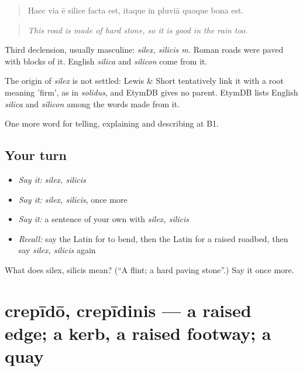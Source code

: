 \begin{quote}
Haec via ē silice facta est, itaque in pluviā quoque bona est.
\end{quote}

\begin{quote}
\emph{This road is made of hard stone, so it is good in the rain too.}
\end{quote}

Third declension, usually masculine: \emph{silex, silicis m.} Roman roads were paved with blocks of it. English \emph{silica} and \emph{silicon} come from it.

\begin{cousinweb}
The origin of \emph{silex} is not settled: Lewis \& Short tentatively link it with a root meaning 'firm', as in \emph{solidus}, and EtymDB gives no parent. EtymDB lists English \emph{silica} and \emph{silicon} among the words made from it.
\end{cousinweb}

\begin{grammarlens}[title={What you've built}]
One more word for telling, explaining and describing at B1.
\end{grammarlens}

\subsection*{Your turn}
\begin{itemize}
\raggedright
  \item \emph{Say it:} \emph{silex, silicis}
  \item \emph{Say it:} \emph{silex, silicis}, once more
  \item \emph{Say it:} a sentence of your own with \emph{silex, silicis}
  \item \emph{Recall:} say the Latin for to bend, then the Latin for a raised roadbed, then say \emph{silex, silicis} again
\end{itemize}

\begin{tcolorbox}[breakable,colback=teal!4,colframe=teal!35!black,title={Before you move on}]
What does silex, silicis mean? (\textquotedblleft{}A flint; a hard paving stone\textquotedblright{}.) Say it once more.
\end{tcolorbox}
\section[crepīdō, crepīdinis]{crepīdō, crepīdinis — a raised edge; a kerb, a raised footway; a quay}

